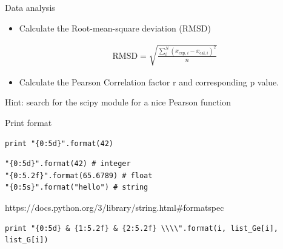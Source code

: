 \begin{frame}[fragile]

    Data analysis

    \begin{itemize}
        \item Calculate the Root-mean-square deviation (RMSD)

        \begin{align*}
            \mathrm{RMSD} = \sqrt{\frac{\sum_i^N (x_{\mathrm{exp},i}-x_{\mathrm{cal},i})^2 }{n}}
        \end{align*}

    \end{itemize}

    \begin{itemize}
        \item Calculate the Pearson Correlation factor r and corresponding p value.
    \end{itemize}

    Hint: search for the scipy module for a nice Pearson function

\end{frame}


\begin{frame}[fragile]
    Print format

\begin{lstlisting}
print "{0:5d}".format(42)
\end{lstlisting}

\begin{lstlisting}
"{0:5d}".format(42) # integer
"{0:5.2f}".format(65.6789) # float
"{0:5s}".format("hello") # string
\end{lstlisting}

https://docs.python.org/3/library/string.html\#formatspec

\begin{lstlisting}
print "{0:5d} & {1:5.2f} & {2:5.2f} \\\\".format(i, list_Ge[i], list_G[i])
\end{lstlisting}


\end{frame}



